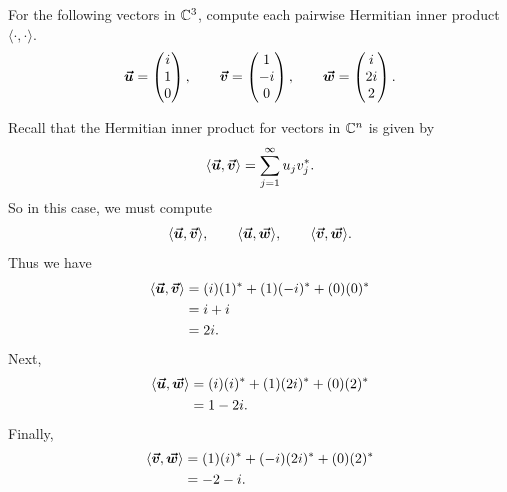 \documentclass[12pt]{article} %
\newcommand{\innprod}[2]{\langle #1, #2\rangle}
\begin{document}
\newpage
\begin{problem}
	For the following vectors in $\mathbb{C}^3$, compute each pairwise Hermitian inner product $\innprod{\cdot}{\cdot}$.  
	\[
		\boldsymbol{\vec{u}} = \begin{pmatrix} i \\ 1 \\ 0 \end{pmatrix}, \qquad \boldsymbol{\vec{v}} = \begin{pmatrix} 1 \\ -i \\ 0 \end{pmatrix}, \qquad \boldsymbol{\vec{w}} = \begin{pmatrix} i \\ 2i \\ 2 \end{pmatrix}.
	\]
\end{problem}
\begin{solution}
	Recall that the Hermitian inner product for vectors in $\mathbb{C}^n$ is given by
	\[
	\innprod{\vecu}{\vecv} = \sum_{j=1}^\infty u_j v_j^*.
	\]
	So in this case, we must compute
	\[
	\innprod{\vecu}{\vecv}, \qquad \innprod{\vecu}{\vecw}, \qquad \innprod{\vecv}{\vecw}.
	\]
	Thus we have
	\begin{align*}
		\innprod{\vecu}{\vecv} &= (i)(1)^*+(1)(-i)^*+(0)(0)^*\\
			&= i +i\\
			&= 2i.
	\end{align*}
	Next,
		\begin{align*}
			\innprod{\vecu}{\vecw} &= (i)(i)^*+(1)(2i)^*+(0)(2)^*\\
				&= 1-2i.
		\end{align*}
	Finally,
	\begin{align*}
		\innprod{\vecv}{\vecw} &= (1)(i)^*+(-i)(2i)^*+(0)(2)^*\\
		&=-2-i.
	\end{align*}
\end{solution}
\end{document}
